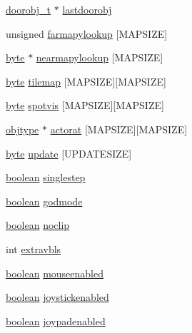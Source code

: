 \begin{DoxyCompactItemize}
\hyperlink{structdoorstruct}{doorobj\_\-t} $\ast$ \hyperlink{WL__DEF_8H_a21442011799a426226eec3654541de23}{lastdoorobj}
\item 
unsigned \hyperlink{WL__DEF_8H_a2d3a9ae720f57b0ebde086d13cdb9af7}{farmapylookup} \mbox{[}MAPSIZE\mbox{]}
\item 
\hyperlink{ID__HEAD_8H_a0c8186d9b9b7880309c27230bbb5e69d}{byte} $\ast$ \hyperlink{WL__DEF_8H_a3cee47da7077796a8215395d7bf23a8b}{nearmapylookup} \mbox{[}MAPSIZE\mbox{]}
\item 
\hyperlink{ID__HEAD_8H_a0c8186d9b9b7880309c27230bbb5e69d}{byte} \hyperlink{WL__DEF_8H_a71276ae4f97677e43033f2f6103b8720}{tilemap} \mbox{[}MAPSIZE\mbox{]}\mbox{[}MAPSIZE\mbox{]}
\item 
\hyperlink{ID__HEAD_8H_a0c8186d9b9b7880309c27230bbb5e69d}{byte} \hyperlink{WL__DEF_8H_a4d17a83d6ebae084e33130e818311b0f}{spotvis} \mbox{[}MAPSIZE\mbox{]}\mbox{[}MAPSIZE\mbox{]}
\item 
\hyperlink{structobjstruct}{objtype} $\ast$ \hyperlink{WL__DEF_8H_a8b6c7ec70ee351719afac0dd216445c7}{actorat} \mbox{[}MAPSIZE\mbox{]}\mbox{[}MAPSIZE\mbox{]}
\item 
\hyperlink{ID__HEAD_8H_a0c8186d9b9b7880309c27230bbb5e69d}{byte} \hyperlink{WL__DEF_8H_a377ee66e839b90ae7140bb0dbde6c696}{update} \mbox{[}UPDATESIZE\mbox{]}
\item 
\hyperlink{ID__HEAD_8H_a7c6368b321bd9acd0149b030bb8275ed}{boolean} \hyperlink{WL__DEF_8H_a46d81099af6d10af477bc30272a05919}{singlestep}
\item 
\hyperlink{ID__HEAD_8H_a7c6368b321bd9acd0149b030bb8275ed}{boolean} \hyperlink{WL__DEF_8H_a23bd83aac925fcfe8d07fc3bbbfc7969}{godmode}
\item 
\hyperlink{ID__HEAD_8H_a7c6368b321bd9acd0149b030bb8275ed}{boolean} \hyperlink{WL__DEF_8H_aad83c32aa52b632f075c971e15ac0180}{noclip}
\item 
int \hyperlink{WL__DEF_8H_abb2d216c89203065d594e55c09f500d5}{extravbls}
\item 
\hyperlink{ID__HEAD_8H_a7c6368b321bd9acd0149b030bb8275ed}{boolean} \hyperlink{WL__DEF_8H_a36b9d776c596f97e2f6fac5bcc96fad3}{mouseenabled}
\item 
\hyperlink{ID__HEAD_8H_a7c6368b321bd9acd0149b030bb8275ed}{boolean} \hyperlink{WL__DEF_8H_aedd645e0ac8f3dd90af15172766bb406}{joystickenabled}
\item 
\hyperlink{ID__HEAD_8H_a7c6368b321bd9acd0149b030bb8275ed}{boolean} \hyperlink{WL__DEF_8H_ae95b411b2704beb68add5bf14c150af5}{joypadenabled}
\item 

\end{DoxyCompactItemize}
